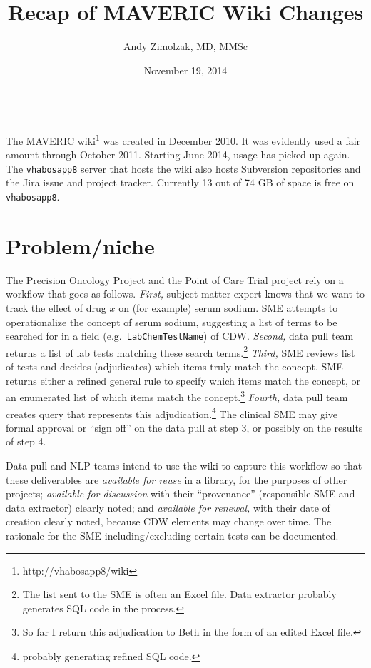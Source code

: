 \documentclass{tufte-handout}
\title{Recap of MAVERIC Wiki Changes}
\author{Andy Zimolzak, MD, MMSc}
\date{November 19, 2014}
\begin{document}
\maketitle

~\\

The MAVERIC wiki\footnote{http://vhabosapp8/wiki} was created in
December 2010. It was evidently used a fair amount through October
2011. Starting June 2014, usage has picked up again. The
\texttt{vhabosapp8} server that hosts the wiki also hosts Subversion
repositories and the Jira issue and project tracker. Currently 13 out
of 74 GB of space is free on \texttt{vhabosapp8}.

\section{Problem/niche}

The Precision Oncology Project and the Point of Care Trial project
rely on a workflow that goes as follows. \emph{First,} subject matter
expert knows that we want to track the effect of drug $x$ on (for
example) serum sodium. SME attempts to operationalize the concept of
serum sodium, suggesting a list of terms to be searched for in a field
(e.g.\ \texttt{LabChemTestName}) of CDW. \emph{Second,} data pull team
returns a list of lab tests matching these search terms.\footnote{The
  list sent to the SME is often an Excel file. Data extractor probably
  generates SQL code in the process.} \emph{Third,} SME reviews list
of tests and decides (adjudicates) which items truly match the
concept. SME returns either a refined general rule to specify which
items match the concept, or an enumerated list of which items match
the concept.\footnote{So far I return this adjudication to Beth in the
  form of an edited Excel file.} \emph{Fourth,} data pull team creates
query that represents this adjudication.\footnote{probably generating
  refined SQL code.} The clinical SME may give formal approval or
``sign off'' on the data pull at step 3, or possibly on the results of
step 4.

Data pull and NLP teams intend to use the wiki to capture this
workflow so that these deliverables are \emph{available for reuse} in
a library, for the purposes of other projects; \emph{available for
  discussion} with their ``provenance'' (responsible SME and data
extractor) clearly noted; and \emph{available for renewal,} with their
date of creation clearly noted, because CDW elements may change over
time. The rationale for the SME including/excluding certain tests can
be documented. 
\end{document}
